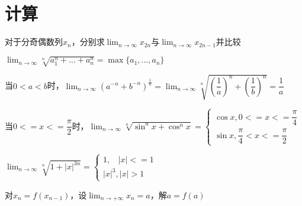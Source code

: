 \section{计算}

对于分奇偶数列\(x_n\)，分别求\(\displaystyle \lim_{n \to \infty}x_{2n}\)与\(\displaystyle \lim_{n \to \infty}x_{2n - 1}\)并比较

\(\displaystyle \lim_{n \to \infty}\sqrt[n]{a_1^n + ... + a_n^n} = \max\{a_1, ..., a_n\}\)

当\(0 < a < b\)时，\(\displaystyle \lim_{n \to \infty}(a^{-n} + b^{-n})^{\frac{1}{n}} = \lim_{n \to \infty}\sqrt[n]{(\dfrac{1}{a})^n + (\dfrac{1}{b})^n} = \dfrac{1}{a}\)

当\(0 <= x <= \dfrac{\pi}{2}\)时，\(\displaystyle \lim_{n \to \infty}\sqrt[n]{\sin^nx + \cos^nx} = 
\begin{cases}
\cos x, 0 <= x <= \dfrac{\pi}{4} \\ 
\sin x, \dfrac{\pi}{4} < x <= \dfrac{\pi}{2}
\end{cases}
\)

\(\displaystyle \lim_{n \to \infty}\sqrt[n]{1 + |x|^{3n}} = 
\begin{cases}
1,\ \ \ \ |x| <= 1 \\ 
|x|^3, |x| > 1
\end{cases}
\)

对\(x_n = f(x_{n - 1})\)，设\(\displaystyle\lim_{n \to +\infty}x_n = a\)，解\(a = f(a)\)

